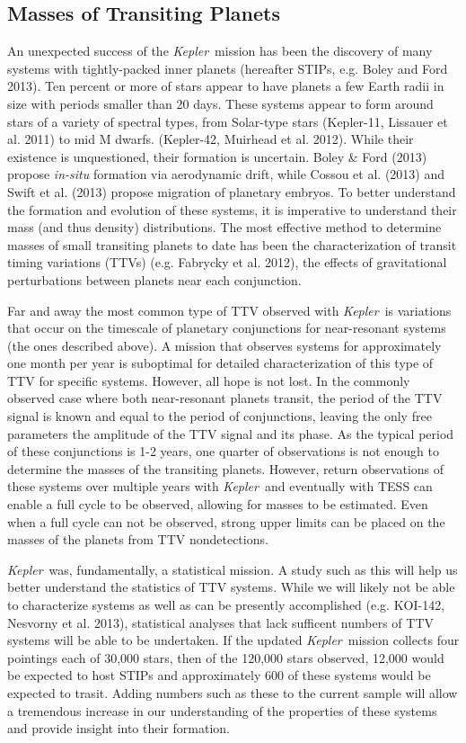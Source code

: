 \documentclass[12pt, preprint]{aastex}
\newcommand{\observatory}[1]{\textsl{#1}}
\newcommand{\kepler}{\observatory{Kepler}}
\newcommand{\Kepler}{\kepler}
\begin{document}
\subsection{Masses of Transiting Planets}
An unexpected success of the \Kepler\ mission has been the discovery of many 
 systems with tightly-packed inner planets (hereafter STIPs, e.g. Boley 
 and Ford 2013). 
Ten percent or more of stars appear to have planets a few Earth radii in size
 with periods smaller than 20 days. 
These systems appear to form around stars of a variety of spectral types, from 
 Solar-type stars (Kepler-11, Lissauer et al. 2011) to mid M dwarfs. 
 (Kepler-42, Muirhead et al. 2012).
While their existence is unquestioned, their formation is uncertain. 
Boley \& Ford (2013) propose \textit{in-situ} formation via aerodynamic drift, 
 while Cossou et al. (2013) and Swift et al. (2013) propose migration of 
 planetary embryos. 
To better understand the formation and evolution of these systems, it 
 is imperative to understand their mass (and thus density) distributions. 
The most effective method to determine masses of small transiting planets 
 to date has been the characterization of transit timing variations (TTVs) 
 (e.g. Fabrycky et al. 2012), the effects of gravitational perturbations
 between planets near each conjunction. 

Far and away the most common type of TTV observed with 
 \Kepler\ is variations that occur on the timescale of planetary conjunctions
 for near-resonant systems (the ones described above). 
A mission that observes systems for approximately one month per year is 
 suboptimal for detailed characterization of this type of TTV for specific 
 systems. 
However, all hope is not lost.
In the commonly observed case where both near-resonant planets transit, the 
 period of the TTV signal is known and equal to the period of conjunctions,
 leaving the only free parameters the amplitude of the TTV signal and its phase.
As the typical period of these conjunctions is 1-2 years, one quarter of
 observations is not enough to determine the masses of the transiting planets. 
However, return observations of these systems over multiple years with \Kepler\
 and eventually with TESS can enable a full cycle to be observed, allowing for 
 masses to be estimated. Even when a full cycle can not be observed, strong 
 upper limits can be placed on the masses of the planets from TTV nondetections.

\Kepler\ was, fundamentally, a statistical mission. 
A study such as this will  help us better understand the statistics of TTV 
 systems. 
While we will likely not be able to characterize systems as well as can be
 presently accomplished  (e.g. KOI-142, Nesvorny et al. 2013), statistical
 analyses that lack sufficent numbers of TTV systems will be able to be 
 undertaken. 
If the updated \Kepler\ mission collects four pointings each of 30,000 stars, 
 then of the 120,000 stars observed, 12,000 would be expected to host STIPs
 and approximately 600 of these systems would be expected to trasit.
Adding numbers such as these to the current sample will allow a tremendous 
 increase in our understanding of the properties of these systems and provide
 insight into their formation.
\end{document}
